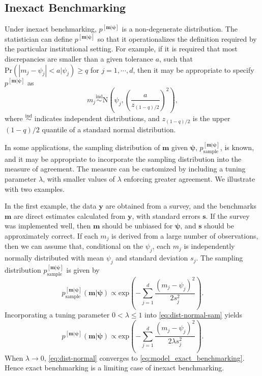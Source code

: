 \documentclass[12pt]{article}
\newcommand{\ind}{\stackrel{\text{ind}}{\sim}}
\begin{document}
\subsection{Inexact Benchmarking}\label{sec:inexact}

Under inexact benchmarking, $p^{[\bm{m}|\bm{\psi}]}$ is a non-degenerate distribution. The statistician can define $p^{[\bm{m}|\bm{\psi}]}$ so that it operationalizes the definition required by the particular institutional setting.  For example, if it is required that most discrepancies are smaller than a given tolerance $a$, such that $\text{Pr}(|m_j-\psi_j|<a|\psi_j)\geq q$ for $j=1,\cdots,d$, then it may be appropriate to specify $p^{[\bm{m}|\bm{\psi}]}$ as
\begin{equation}
m_j\ind \text{N}\left(\psi_j,\left(\frac{a}{z_{(1-q)/2}}\right)^2\right),
\end{equation}
where $\ind$ indicates independent distributions, and $z_{(1-q)/2}$ is the upper $(1-q)/2$ quantile of a standard normal distribution.

In some applications, the sampling distribution of $\bm{m}$ given $\bm{\psi}$, $p^{[\bm{m}|\bm{\psi}]}_{\text{sample}}$, is known, and it may be appropriate to incorporate the sampling distribution into the measure of agreement.  The measure can be customized by including a tuning parameter $\lambda$, with smaller values of $\lambda$ enforcing greater agreement.  We illustrate with two examples.

In the first example, the data $\bm{y}$ are obtained from a survey, and the benchmarks $\bm{m}$ are direct estimates calculated from $\bm{y}$, with standard errors $\bm{s}$.  If the survey was implemented well, then $\bm{m}$ should be unbiased for $\bm{\psi}$, and $\bm{s}$ should be approximately correct. If each $m_j$ is derived from a large number of observations, then we can assume that, conditional on the $\psi_j$, each $m_j$ is independently normally distributed with mean $\psi_j$ and standard deviation $s_j$.  The sampling distribution $p^{[\bm{m}|\bm{\psi}]}_{\text{sample}}$ is given by
\begin{equation}
p^{[\bm{m}|\bm{\psi}]}_{\text{sample}}(\bm{m}|\bm{\psi})\propto\text{exp}\left( - \sum_{j=1}^d \frac{ ( m_j-\psi_j)^2}{ 2 s_j^2} \right). \label{eq:dist-normal-sam}
\end{equation}
Incorporating a tuning parameter $0 < \lambda \leq 1$ into \eqref{eq:dist-normal-sam} yields
\begin{equation}
p^{[\bm{m}|\bm{\psi}]}(\bm{m}|\bm{\psi})\propto\text{exp}\left( - \sum_{j=1}^d \frac{ ( m_j-\psi_j)^2}{ 2 \lambda s_j^2} \right). \label{eq:dist-normal}
\end{equation}
When $\lambda\rightarrow 0$, \eqref{eq:dist-normal} converges to \eqref{eq:model_exact_benchmarking}.  Hence exact benchmarking is a limiting case of inexact benchmarking.
\end{document}
